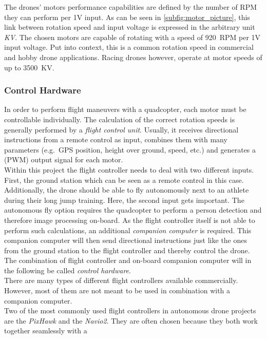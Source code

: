\FloatBarrier
The drones' motors performance capabilities are defined by the number of 
\ac{RPM} they can perform per 1V input.
As can be seen in \autoref{subfig:motor_picture}, this link between 
rotation speed and input voltage is expressed in the arbitrary unit \textit{KV}.
The chosen motors are capable of rotating with a speed of 920~\ac{RPM} per 1V 
input voltage. 
Put into context, this is a common rotation speed in commercial and hobby 
drone applications.
Racing drones however, operate at motor speeds of up to 3500~KV.

\subsubsection{Control Hardware}\label{subsec:4_control_hardware}
In order to perform flight maneuvers with a quadcopter, each motor must be
controllable individually.
The calculation of the correct rotation speeds is generally performed by 
a \textit{flight control unit}.
Usually, it receives directional instructions from a remote control as input,
combines them with many parameters (e.g.~\acs{GPS} position, height over ground,
speed, etc.) and generates a (\acs{PWM}) output signal for each motor.\\
Within this project the flight controller needs to deal with two different 
inputs.
First, the ground station which can be seen as a remote control in this case.
Additionally, the drone should be able to fly autonomously next to an athlete
during their long jump training.
Here, the second input gets important.
The autonomous fly option requires the quadcopter to perform a person 
detection and therefore image processing on-board.
As the flight controller itself is not able to perform such calculations, an
additional \textit{companion computer} is required.
This companion computer will then send directional instructions just like the 
ones from the ground station to the flight controller and thereby control the 
drone.\\
The combination of flight controller and on-board companion computer will in 
the following be called \textit{control hardware}.\\
There are many types of different flight controllers available commercially.
However, most of them are not meant to be used in combination with a companion
computer.\\
Two of the most commonly used flight controllers in autonomous drone projects
are the \textit{PixHawk} and the \textit{Navio2}.
They are often chosen because they both work together seamlessly with a 

